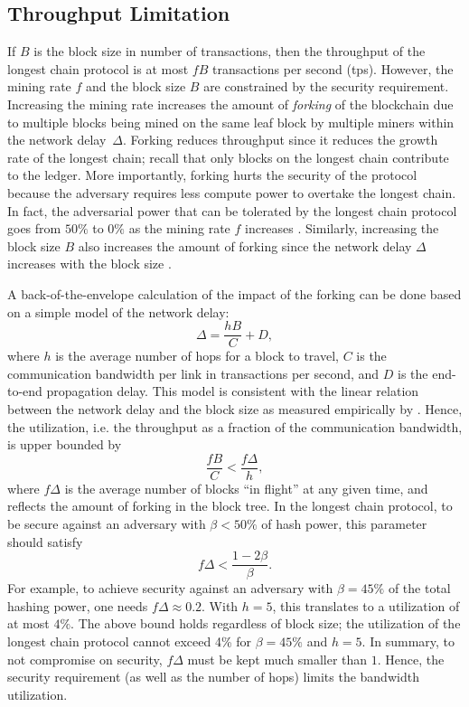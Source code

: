 \subsection{Throughput Limitation}
\label{s:lc-thput}

If $B$ is the block size in number of transactions, then the throughput of the longest chain protocol is at most $fB$ transactions per second (tps). 
However, the mining rate $f$ and the block size $B$ are constrained by the security requirement. Increasing the mining rate increases the amount of {\em forking} of the blockchain due to multiple blocks being mined on the same leaf block by multiple miners within the network delay~$\Delta$. Forking reduces throughput since it reduces the growth rate of the longest chain; recall that only blocks on the longest chain contribute to the ledger. More importantly, forking hurts the security of the protocol because the adversary requires less compute power to overtake the longest chain. In fact, the adversarial power that can be tolerated by the longest chain protocol goes from $50\%$ to $0\%$ as the mining rate $f$ increases \cite{backbone}. 
Similarly, increasing the block size $B$ also increases the amount of forking since the network delay $\Delta$ increases with the block size \cite{decker}.

A back-of-the-envelope calculation of the impact of the forking can be done based on a simple model of the network delay: 
$$ \Delta = \frac{hB}{C} + D,$$
where $h$ is the average number of hops for a block to travel, $C$ is the communication bandwidth per link in transactions per second, and $D$ is the end-to-end propagation delay.  This model is consistent with the linear relation between the network delay and the block size as measured empirically by \cite{decker}. 
Hence, the utilization, i.e. the throughput as a fraction of the communication bandwidth, is upper bounded by
$$ \frac{fB}{C} < \frac{f\Delta}{h},$$
where $f\Delta$ is the average number of blocks ``in flight'' at any given time, and reflects the amount of forking in the block tree.  %
In the longest chain protocol, to be secure against an adversary with $\beta < 50\%$ of hash power, this parameter should satisfy \cite{backbone}
$$f\Delta<\frac{1-2\beta}{\beta}.$$
For example, to achieve security against an adversary with $\beta = 45\%$ of the total hashing power, one needs $f\Delta \approx 0.2$. With $h = 5$, this translates to a utilization of at most $4\%$. The above bound holds regardless of block size; the utilization of the longest chain protocol cannot exceed 4\% for $\beta = 45\%$ and $h=5$.
In summary, to not compromise on security, $f\Delta$ must be kept much smaller than $1$. 
Hence, the security requirement (as well as the number of hops) limits the bandwidth utilization.  

